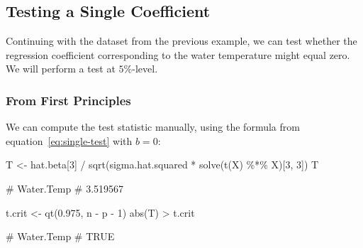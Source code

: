 \documentclass[
  a4paper,
]{article}
\newenvironment{Shaded}{\begin{snugshade}}{\end{snugshade}}
\newcommand{\DecValTok}[1]{\textcolor[rgb]{0.00,0.00,0.81}{#1}}
\newcommand{\FloatTok}[1]{\textcolor[rgb]{0.00,0.00,0.81}{#1}}
\newcommand{\FunctionTok}[1]{\textcolor[rgb]{0.00,0.00,0.00}{#1}}
\newcommand{\NormalTok}[1]{#1}
\newcommand{\OtherTok}[1]{\textcolor[rgb]{0.56,0.35,0.01}{#1}}
\newcommand{\SpecialCharTok}[1]{\textcolor[rgb]{0.00,0.00,0.00}{#1}}
\theoremstyle{definition}
\theoremstyle{definition}
\theoremstyle{definition}
\theoremstyle{definition}
\theoremstyle{remark}
\begin{document}
\hypertarget{testing-a-single-coefficient}{%
\subsection{Testing a Single Coefficient}\label{testing-a-single-coefficient}}

Continuing with the dataset from the previous example, we can test whether the
regression coefficient corresponding to the water temperature might equal zero.
We will perform a test at \(5\%\)-level.

\hypertarget{from-first-principles-1}{%
\subsubsection{From First Principles}\label{from-first-principles-1}}

We can compute the test statistic manually, using the formula from
equation~\eqref{eq:single-test} with \(b = 0\):

\begin{Shaded}
\begin{Highlighting}[]
\NormalTok{T }\OtherTok{\textless{}{-}}\NormalTok{ hat.beta[}\DecValTok{3}\NormalTok{] }\SpecialCharTok{/} \FunctionTok{sqrt}\NormalTok{(sigma.hat.squared }\SpecialCharTok{*} \FunctionTok{solve}\NormalTok{(}\FunctionTok{t}\NormalTok{(X) }\SpecialCharTok{\%*\%}\NormalTok{ X)[}\DecValTok{3}\NormalTok{, }\DecValTok{3}\NormalTok{])}
\NormalTok{T}
\end{Highlighting}
\end{Shaded}

\begin{Shaded}
\begin{Highlighting}[]
\NormalTok{\# Water.Temp }
\NormalTok{\#   3.519567}
\end{Highlighting}
\end{Shaded}

\begin{Shaded}
\begin{Highlighting}[]
\NormalTok{t.crit }\OtherTok{\textless{}{-}} \FunctionTok{qt}\NormalTok{(}\FloatTok{0.975}\NormalTok{, n }\SpecialCharTok{{-}}\NormalTok{ p }\SpecialCharTok{{-}} \DecValTok{1}\NormalTok{)}
\FunctionTok{abs}\NormalTok{(T) }\SpecialCharTok{\textgreater{}}\NormalTok{ t.crit}
\end{Highlighting}
\end{Shaded}

\begin{Shaded}
\begin{Highlighting}[]
\NormalTok{\# Water.Temp }
\NormalTok{\#       TRUE}
\end{Highlighting}
\end{Shaded}
\end{document}
